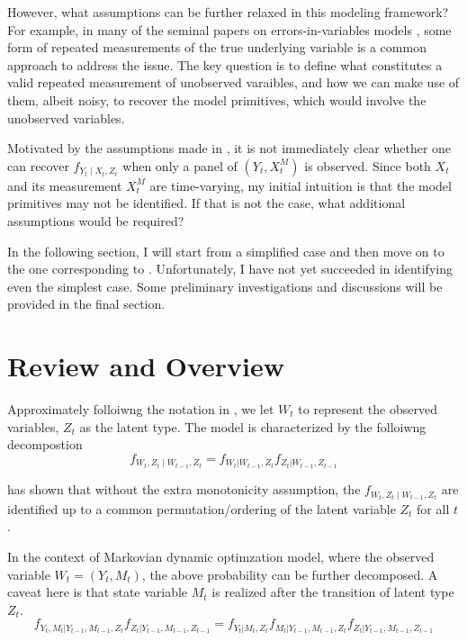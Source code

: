 \documentclass[12pt]{article}
\begin{document}
However, what assumptions can be further relaxed in this modeling framework? For example, in many of the seminal papers on errors-in-variables models \citep{hu2008identification, hu2008instrumental, carroll2010identification}, some form of repeated measurements of the true underlying variable is a common approach to address the issue. The key question is to define what constitutes a valid repeated measurement of unobserved varaibles, and how we can make use of them, albeit noisy, to recover the model primitives, which would involve the unobserved variables.

Motivated by the assumptions made in \citet{todd2020dynamic}, it is not immediately clear whether one can recover $f_{Y_t \mid X_t, Z_t}$ when only a panel of $(Y_t, X^M_t)$ is observed. Since both $X_t$ and its measurement $X^M_t$ are time-varying, my initial intuition is that the model primitives may not be identified. If that is not the case, what additional assumptions would be required?

In the following section, I will start from a simplified case and then move on to the one corresponding to \citet{todd2020dynamic}. Unfortunately, I have not yet succeeded in identifying even the simplest case. Some preliminary investigations and discussions will be provided in the final section.


\section{Review and Overview}

Approximately folloiwng the notation in \citet{hu2012nonparametric}, we let
$W_t$ to represent the observed variables, $Z_t$ as the latent type. The model is characterized by the folloiwng decompostion
\begin{equation}\label{eq:hushum2012}
    f_{W_t,Z_t\mid W_{t-1},Z_t}=f_{W_t|W_{t-1},Z_t}f_{Z_t|W_{t-1},Z_{t-1}}
\end{equation}

\citet{} has shown that without the extra monotonicity assumption, the $ f_{W_t,Z_t\mid W_{t-1},Z_t}$ are identified up to a common permutation/ordering of the latent variable $Z_t$ for all $t$.

In the context of Markovian dynamic optimzation model, where the observed variable $W_t=(Y_t,M_t)$, the above probability can be further decomposed. A caveat here is that state variable $M_t$ is realized after the transition of latent type $Z_t$.
\begin{equation}\label{eq:hushum2012_mdp}
    f_{Y_t,M_t|Y_{t-1},M_{t-1},Z_t}f_{Z_t|Y_{t-1},M_{t-1},Z_{t-1}}=f_{Y_t|M_t,Z_t}f_{M_t|Y_{t-1},M_{t-1},Z_t}f_{Z_t|Y_{t-1},M_{t-1},Z_{t-1}}
\end{equation}
\end{document}
